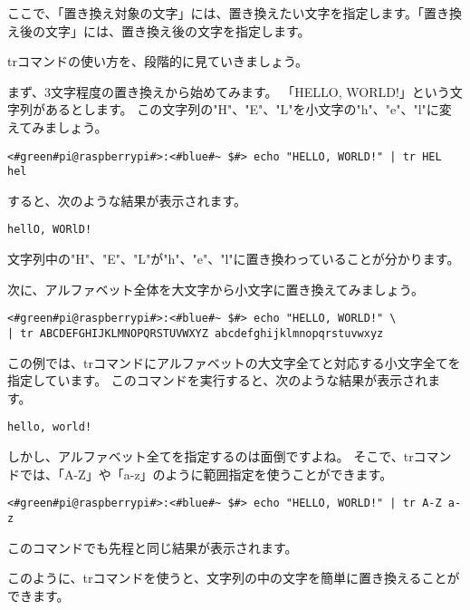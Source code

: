 ここで、「置き換え対象の文字」には、置き換えたい文字を指定します。「置き換え後の文字」には、置き換え後の文字を指定します。

trコマンドの使い方を、段階的に見ていきましょう。

まず、3文字程度の置き換えから始めてみます。
「HELLO, WORLD!」という文字列があるとします。
この文字列の"H"、"E"、"L"を小文字の"h"、"e"、"l"に変えてみましょう。

\begin{lstlisting}[caption=3文字の置き換え, label=tr_3_chars]
<#green#pi@raspberrypi#>:<#blue#~ $#> echo "HELLO, WORLD!" | tr HEL hel
\end{lstlisting}

すると、次のような結果が表示されます。

\begin{lstlisting}[caption=3文字を置き換えた結果, label=result_tr_3_chars]
hellO, WORlD!
\end{lstlisting}

文字列中の"H"、"E"、"L"が"h"、"e"、"l"に置き換わっていることが分かります。

次に、アルファベット全体を大文字から小文字に置き換えてみましょう。

\begin{lstlisting}[caption=アルファベット全体の置き換え, label=tr_all_chars]
<#green#pi@raspberrypi#>:<#blue#~ $#> echo "HELLO, WORLD!" \
| tr ABCDEFGHIJKLMNOPQRSTUVWXYZ abcdefghijklmnopqrstuvwxyz
\end{lstlisting}

この例では、trコマンドにアルファベットの大文字全てと対応する小文字全てを指定しています。
このコマンドを実行すると、次のような結果が表示されます。

\begin{lstlisting}[caption=アルファベット全体を置き換えた結果, label=result_tr_all_chars]
hello, world!
\end{lstlisting}

しかし、アルファベット全てを指定するのは面倒ですよね。
そこで、trコマンドでは、「A-Z」や「a-z」のように範囲指定を使うことができます。

\begin{lstlisting}[caption=範囲指定を使った置き換え, label=tr_range]
<#green#pi@raspberrypi#>:<#blue#~ $#> echo "HELLO, WORLD!" | tr A-Z a-z
\end{lstlisting}

このコマンドでも先程と同じ結果が表示されます。

このように、trコマンドを使うと、文字列の中の文字を簡単に置き換えることができます。

